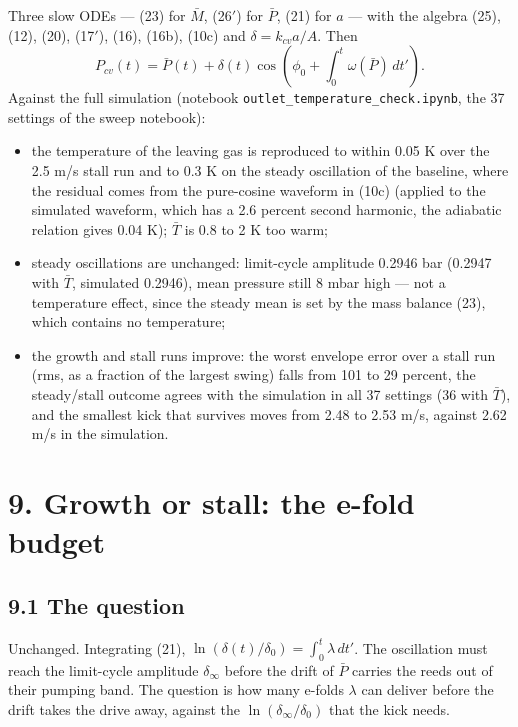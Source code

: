 \documentclass[11pt]{article}
\begin{document}
Three slow ODEs --- (23) for $\bar M$, (26$'$) for $\bar P$, (21) for $a$ --- with the algebra (25), (12), (20), (17$'$), (16), (16b), (10c) and $\delta = k_{cv}a/A$. Then
\begin{equation}
P_{cv}(t) = \bar P(t) + \delta(t)\cos\left(\phi_0 + \int_0^t\omega(\bar P)\,dt'\right) . \tag{27}
\end{equation}
Against the full simulation (notebook \texttt{outlet\_temperature\_check.ipynb}, the 37 settings of the sweep notebook):
\begin{itemize}
\item the temperature of the leaving gas is reproduced to within 0.05 K over the 2.5 m/s stall run and to 0.3 K on the steady oscillation of the baseline, where the residual comes from the pure-cosine waveform in (10c) (applied to the simulated waveform, which has a 2.6 percent second harmonic, the adiabatic relation gives 0.04 K); $\bar T$ is 0.8 to 2 K too warm;
\item steady oscillations are unchanged: limit-cycle amplitude 0.2946 bar (0.2947 with $\bar T$, simulated 0.2946), mean pressure still 8 mbar high --- not a temperature effect, since the steady mean is set by the mass balance (23), which contains no temperature;
\item the growth and stall runs improve: the worst envelope error over a stall run (rms, as a fraction of the largest swing) falls from 101 to 29 percent, the steady/stall outcome agrees with the simulation in all 37 settings (36 with $\bar T$), and the smallest kick that survives moves from 2.48 to 2.53 m/s, against 2.62 m/s in the simulation.
\end{itemize}

\section*{9. Growth or stall: the e-fold budget}

\subsection*{9.1 The question}

Unchanged. Integrating (21), $\ln(\delta(t)/\delta_0) = \int_0^t\lambda\,dt'$. The oscillation must reach the limit-cycle amplitude $\delta_\infty$ before the drift of $\bar P$ carries the reeds out of their pumping band. The question is how many e-folds $\lambda$ can deliver before the drift takes the drive away, against the $\ln(\delta_\infty/\delta_0)$ that the kick needs.
\end{document}
